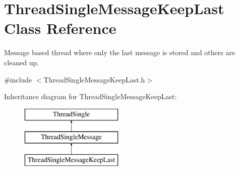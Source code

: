 \hypertarget{class_thread_single_message_keep_last}{
\section{ThreadSingleMessageKeepLast Class Reference}
\label{class_thread_single_message_keep_last}
}


Message based thread where only the last message is stored and others are cleaned up.  




{\ttfamily \#include $<$ThreadSingleMessageKeepLast.h$>$}

Inheritance diagram for ThreadSingleMessageKeepLast:\begin{figure}[H]
\begin{center}
\leavevmode
\includegraphics[height=3.000000cm]{class_thread_single_message_keep_last}
\end{center}
\end{figure}
